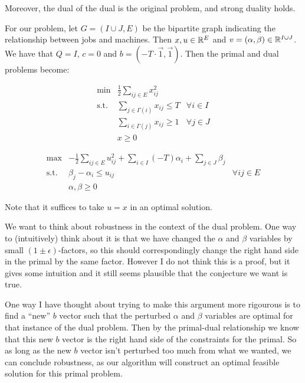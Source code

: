 \documentclass[11pt]{article}
\newcommand{\R}{\ensuremath \mathbb{R}}
\begin{document}
Moreover, the dual of the dual is the original problem, and strong duality holds.

For our problem, let $G = (I \cup J , E)$ be the bipartite graph indicating the relationship between jobs and machines.  Then $x, u \in \R^E$ and $v = (\alpha,\beta) \in \R^{I \cup J}$.  We have that $Q = I$, $c= 0$ and $b = (-T \cdot \vec{1}, \vec{1})$.  Then the primal and dual problems become:

\[
\begin{array}{ccc}
\min & \frac{1}{2} \displaystyle\sum_{ij \in E} x_{ij}^2 & \\
\text{s.t.} & \displaystyle\sum_{j \in \Gamma(i)} x_{ij} \leq T & \forall i \in I \\
 & \displaystyle\sum_{i \in \Gamma(j)} x_{ij} \geq 1 & \forall j \in J\\ 
 & x \geq 0 
\end{array}
\]

\[
\begin{array}{ccc}
\max & -\frac{1}{2} \displaystyle\sum_{ij \in E} u_{ij}^2 + \displaystyle\sum_{i \in I} (-T) \alpha_{i} + \displaystyle \sum_{j \in J} \beta_j & \\
\text{s.t.} & \beta_{j} - \alpha_{i} \leq u_{ij} & \forall ij \in E \\
 & \alpha, \beta \geq 0 
\end{array}
\]

Note that it suffices to take $u = x$ in an optimal solution.

We want to think about robustness in the context of the dual problem.  One way to (intuitively) think about it is that we have changed the $\alpha$ and $\beta$ variables by small $(1\pm\epsilon)$-factors, so this should correspondingly change the right hand side in the primal by the same factor.  However I do not think this is a proof, but it gives some intuition and it still seems plausible that the conjecture we want is true.

One way I have thought about trying to make this argument more rigourous is to find a ``new'' $b$ vector such that the perturbed $\alpha$ and $\beta$ variables are optimal for that instance of the dual problem.  Then by the primal-dual relationship we know that this new $b$ vector is the right hand side of the constraints for the primal.  So as long as the new $b$ vector isn't perturbed too much from what we wanted, we can conclude robustness, as our algorithm will construct an optimal feasible solution for this primal problem.
\end{document}
